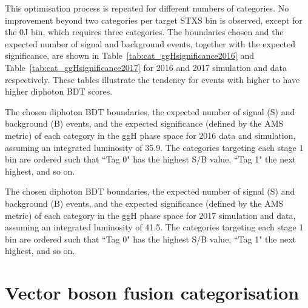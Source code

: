 This optimisation process is repeated for different numbers of categories.
No improvement beyond two categories per target STXS bin is observed, 
except for the 0J bin, which requires three categories.
The boundaries chosen and the expected number of signal and background events, 
together with the expected significance, 
are shown in Table~\ref{tab:cat_ggHsignificance2016} and Table~\ref{tab:cat_ggHsignificance2017} 
for 2016 and 2017 simulation and data respectively.
These tables illustrate the tendency for events with higher \ptH to have higher diphoton BDT scores.

\begin{table}
  \begin{centering}
    
    \caption[Definitions of 2016 categories targeting ggH production.]
    {
      The chosen diphoton BDT boundaries, 
      the expected number of signal (S) and background (B) events, 
      and the expected significance (defined by the AMS metric) of each category in the ggH phase space 
      for 2016 data and simulation, assuming an integrated luminosity of \SI{35.9}{\fbinv}.
      The categories targeting each stage 1 bin are ordered such that ``Tag 0" 
      has the highest S/B value, ``Tag 1" the next highest, and so on. 
    }
    \label{tab:cat_ggHsignificance2016}
  \end{centering}
\end{table}

\begin{table}
  \begin{centering}
    
    \caption[Definitions of 2017 categories targeting ggH production.]
    {
      The chosen diphoton BDT boundaries, 
      the expected number of signal (S) and background (B) events, 
      and the expected significance (defined by the AMS metric) of each category in the ggH phase space 
      for 2017 simulation and data, assuming an integrated luminosity of \SI{41.5}{\fbinv}.
      The categories targeting each stage 1 bin are ordered such that ``Tag 0" 
      has the highest S/B value, ``Tag 1" the next highest, and so on. 
    }
    \label{tab:cat_ggHsignificance2017}
  \end{centering}
\end{table}

\clearpage

\section{Vector boson fusion categorisation}
